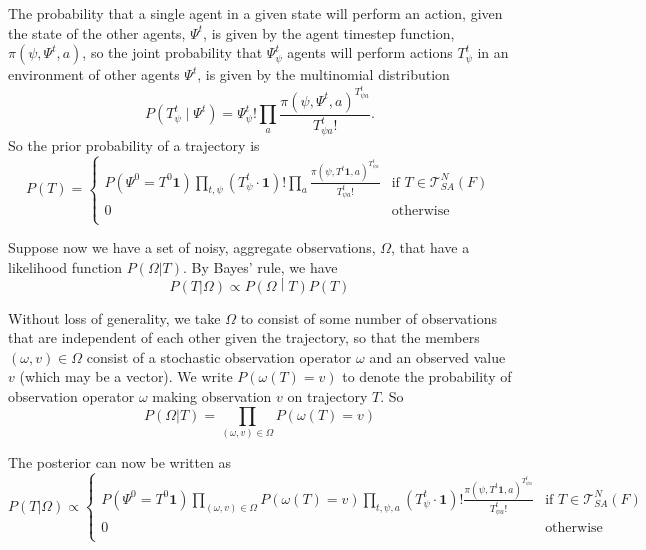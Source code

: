 \documentclass{article}
\begin{document}
The probability that a single agent in a given state will perform an action, given the state of the other agents, $\Psi^t$, is given by the agent timestep function, $\pi(\psi,\Psi^t,a)$, so the joint probability that $\Psi^t_\psi$ agents will perform actions $T^t_{\psi}$ in an environment of other agents $\Psi^t$, is given by the multinomial distribution
\[
P\left(T^t_{\psi} \mid \Psi^t \right) = \Psi^t_\psi!\prod_a \frac{\pi(\psi,\Psi^t,a)^{T^{t}_{\psi a}}}{T^{t}_{\psi a}!}.
\]
So the prior probability of a trajectory is
\[
P(T) =
\begin{cases}
P(\Psi^0 = T^0\mathbf{1})
\prod_{t, \psi}\left(T^t_{\psi} \cdot \mathbf{1} \right)!
\prod_a \frac{\pi(\psi, T^{t}\mathbf{1},a)^{T^{t}_{\psi a}}}{T^{t}_{\psi a}!} & \text{if } T \in \mathcal{T}^N_{SA}(F) \\
0 & \text{otherwise}\\
\end{cases}
\]

Suppose now we have a set of noisy, aggregate observations, $\Omega$, that have a likelihood function $P(\Omega|T)$. By Bayes' rule, we have
\[
P(T|\Omega) \propto P\left(\Omega \middle| T\right)P(T)
\]

Without loss of generality, we take $\Omega$ to consist of some number of observations that are independent of each other given the trajectory, so that the members $(\omega,v)\in \Omega$ consist of a stochastic observation operator $\omega$ and an observed value $v$ (which may be a vector). We write $P(\omega(T)=v)$ to denote the probability of observation operator $\omega$ making observation $v$ on trajectory $T$. So
\[
P(\Omega|T) = \prod_{(\omega,v) \in \Omega} P(\omega(T)=v)
\]

The posterior can now be written as
\begin{equation}
P(T|\Omega) \propto 
\begin{cases}
P(\Psi^0 = T^0\mathbf{1})
\prod_{(\omega,v) \in \Omega} P\left(\omega(T)=v\right)
\prod_{t, \psi, a}\left(T^t_{\psi}\cdot\mathbf{1}\right)!
\frac{\pi(\psi,T^t\mathbf{1},a)^{T^{t}_{\psi a}}}{T^t_{\psi a}!} & \text{if } T \in \mathcal{T}^N_{SA}(F) \\
0 & \text{otherwise}\\
\end{cases}
\label{posterior}
\end{equation}
\end{document}
